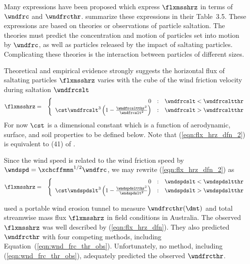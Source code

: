 \documentclass[12pt,twoside]{book}
\begin{document}
Many expressions have been proposed which express $\flxmsshrz$ in terms
of $\wndfrc$ and $\wndfrcthr$.
\cite{GrI85} summarize these expressions in their Table~3.5.
These expressions are based on theories or observations of particle
saltation.
The theories must predict the concentration and motion of particles
set into motion by $\wndfrc$, as well as particles released by the
impact of saltating particles.
Complicating these theories is the interaction between particles of
different sizes.

Theoretical and empirical evidence strongly suggests the horizontal
flux of saltating particles $\flxmsshrz$ varies with the cube of the
wind friction velocity during saltation $\wndfrcslt$
\cite{Owe64,SRF93} 
\begin{eqnarray}
\flxmsshrz & = & \left\{
\begin{array}{r@{\quad:\quad}l}
0 & \wndfrcslt < \wndfrcsltthr \\
\cst \wndfrcslt^{3} \left( 1 - \frac{\wndfrcsltthr^{2}}{\wndfrcslt^{2}} \right) & \wndfrcslt > \wndfrcsltthr
\end{array} \right.
\label{eqn:flx_hrz_dfn_2}
\end{eqnarray}
For now $\cst$ is a dimensional constant which is a function of
aerodynamic, surface, and soil properties to be defined below. 
Note that (\ref{eqn:flx_hrz_dfn_2}) is equivalent to (41) of
\cite{Owe64}. 

Since the wind speed is related to the wind friction speed by 
$\wndspd = \xchcffmmn^{1/2} \wndfrc$, we may rewrite
(\ref{eqn:flx_hrz_dfn_2}) as 
\begin{eqnarray}
\flxmsshrz & = & \left\{
\begin{array}{r@{\quad:\quad}l}
0 & \wndspdslt < \wndspdsltthr \\
\cst \wndspdslt^{3} \left( 1 - \frac{\wndspdsltthr^{2}}{\wndspdslt^{2}} \right) & \wndspdslt > \wndspdsltthr
\end{array} \right.
\label{eqn:flx_hrz_dfn_3}
\end{eqnarray}

\cite{LeR91} used a portable wind erosion tunnel to measure 
$\wndfrcthr(\dmt)$ and total streamwise mass flux $\flxmsshrz$ in field
conditions in Australia. 
The observed $\flxmsshrz$ was well described by (\ref{eqn:flx_hrz_dfn}).
They also predicted $\wndfrcthr$ with four competing methods,
including Equation~(\ref{eqn:wnd_frc_thr_obs}).
Unfortunately, no method, including (\ref{eqn:wnd_frc_thr_obs}),
adequately predicted the observed $\wndfrcthr$.
\end{document}
